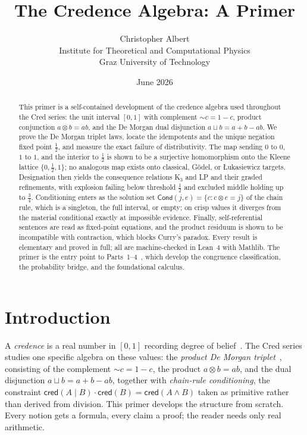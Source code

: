 \documentclass[11pt,a4paper]{article}
\title{The Credence Algebra: A Primer}
\author{Christopher Albert\\
\small Institute for Theoretical and Computational Physics\\
\small Graz University of Technology}
\date{June 2026}
\newcommand{\cred}{\mathsf{cred}}
\newcommand{\negc}{\mathord{\sim}}
\newcommand{\conjc}{\otimes}
\newcommand{\disjc}{\sqcup}
\newcommand{\Cond}{\mathsf{Cond}}
\begin{document}
\maketitle

\begin{abstract}
This primer is a self-contained development of the credence algebra
used throughout the Cred series: the unit interval $[0,1]$ with
complement $\negc c = 1 - c$, product conjunction
$a \conjc b = ab$, and the De Morgan dual disjunction
$a \disjc b = a + b - ab$.
We prove the De Morgan triplet laws, locate the idempotents and the
unique negation fixed point $\tfrac{1}{2}$, and measure the exact
failure of distributivity.
The map sending $0$ to $0$, $1$ to $1$, and the interior to
$\tfrac{1}{2}$ is shown to be a surjective homomorphism onto the
Kleene lattice $\{0, \tfrac{1}{2}, 1\}$; no analogous map exists onto
classical, G\"odel, or \L ukasiewicz targets.
Designation then yields the consequence relations K$_3$ and LP and
their graded refinements, with explosion failing below threshold
$\tfrac{1}{2}$ and excluded middle holding up to $\tfrac{3}{4}$.
Conditioning enters as the solution set
$\Cond(j,e) = \{c : c \conjc e = j\}$ of the chain rule, which is a
singleton, the full interval, or empty; on crisp values it diverges
from the material conditional exactly at impossible evidence.
Finally, self-referential sentences are read as fixed-point equations,
and the product residuum is shown to be incompatible with contraction,
which blocks Curry's paradox.
Every result is elementary and proved in full; all are machine-checked
in Lean~4 with Mathlib.
The primer is the entry point to
Parts~1--4~\cite{part1,part2}, which develop the congruence
classification, the probability bridge, and the foundational calculus.
\end{abstract}

\section{Introduction}
\label{sec:intro}

A \emph{credence} is a real number in $[0,1]$ recording degree of
belief~\cite{definetti1937,jaynes2003}.
The Cred series studies one specific algebra on these values: the
\emph{product De Morgan triplet}~\cite{klement2000,hajek1998},
consisting of the complement $\negc c = 1 - c$, the product
$a \conjc b = ab$, and the dual disjunction
$a \disjc b = a + b - ab$,
together with \emph{chain-rule conditioning}, the constraint
$\cred(A \mid B) \cdot \cred(B) = \cred(A \land B)$ taken as
primitive rather than derived from division.
This primer develops the structure from scratch.
Every notion gets a formula, every claim a proof; the reader needs
only real arithmetic.
\end{document}
